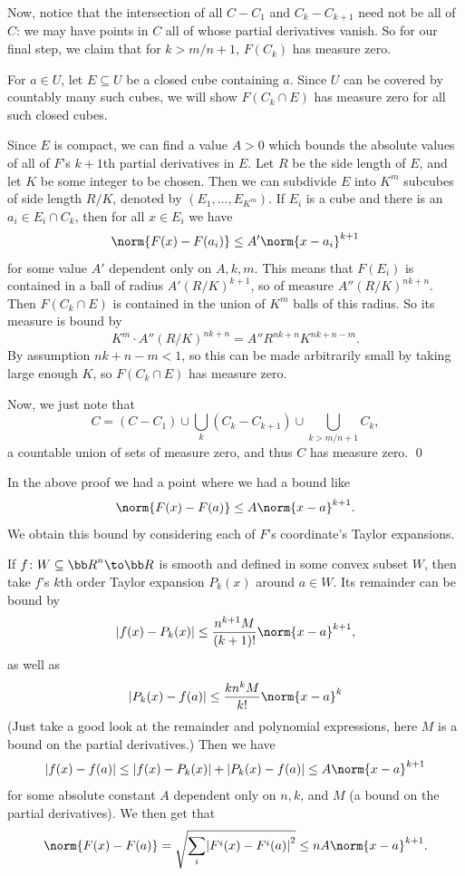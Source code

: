         \item Now, notice that the intersection of all $C-C_1$ and $C_k-C_{k+1}$ need not be all of $C$: we may have points in $C$ all of whose partial
        derivatives vanish.
        So for our final step, we claim that for $k>m/n+1$, $F(C_k)$ has measure zero.

        For $a\in U$, let $E\subseteq U$ be a closed cube containing $a$.
        Since $U$ can be covered by countably many such cubes, we will show $F(C_k\cap E)$ has measure zero for all such closed cubes.

        Since $E$ is compact, we can find a value $A>0$ which bounds the absolute values of all of $F$'s $k+1$th partial derivatives in $E$.
        Let $R$ be the side length of $E$, and let $K$ be some integer to be chosen.
        Then we can subdivide $E$ into $K^m$ subcubes of side length $R/K$, denoted by $(E_1,\dots,E_{K^m})$.
        If $E_i$ is a cube and there is an $a_i\in E_i\cap C_k$, then for all $x\in E_i$ we have
        $$ \norm{F(x) - F(a_i)} \leq A'\norm{x-a_i}^{k+1} $$
        for some value $A'$ dependent only on $A,k,m$.
        This means that $F(E_i)$ is contained in a ball of radius $A'(R/K)^{k+1}$, so of measure $A''(R/K)^{nk+n}$.
        Then $F(C_k\cap E)$ is contained in the union of $K^m$ balls of this radius.
        So its measure is bound by
        $$ K^m\cdot A''(R/K)^{nk+n} = A''R^{nk+n}K^{nk+n-m} . $$
        By assumption $nk+n-m<1$, so this can be made arbitrarily small by taking large enough $K$, so $F(C_k\cap E)$ has measure zero.
    \eenum

    Now, we just note that
    $$ C = (C-C_1) \cup \bigcup_k (C_k-C_{k+1}) \cup \bigcup_{k>m/n+1} C_k , $$
    a countable union of sets of measure zero, and thus $C$ has measure zero.
    \qed

\eproof

\bnote

    In the above proof we had a point where we had a bound like
    $$ \norm{F(x) - F(a)} \leq A\norm{x-a}^{k+1} . $$
    We obtain this bound by considering each of $F$'s coordinate's Taylor expansions.

    If $f\colon W\subseteq\bR^n\to\bR$ is smooth and defined in some convex subset $W$, then take $f$'s $k$th order Taylor expansion $P_k(x)$ around $a\in W$.
    Its remainder can be bound by
    $$ \abs{f(x) - P_k(x)} \leq \frac{n^{k+1}M}{(k+1)!}\norm{x-a}^{k+1} , $$
    as well as
    $$ \abs{P_k(x) - f(a)} \leq \frac{kn^kM}{k!}\norm{x-a}^k $$
    (Just take a good look at the remainder and polynomial expressions, here $M$ is a bound on the partial derivatives.)
    Then we have
    $$ \abs{f(x) - f(a)} \leq \abs{f(x) - P_k(x)} + \abs{P_k(x) - f(a)} \leq A\norm{x-a}^{k+1} $$
    for some absolute constant $A$ dependent only on $n,k$, and $M$ (a bound on the partial derivatives).
    We then get that
    $$ \norm{F(x) - F(a)} = \sqrt{\sum_i\abs{F^i(x)-F^i(a)}^2} \leq nA\norm{x-a}^{k+1} . $$

